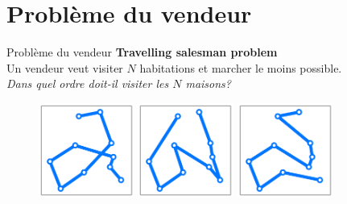 \documentclass{beamer}
\begin{document}
\section{Problème du vendeur}
\begin{frame}{Problème du vendeur}
  \textbf{Travelling salesman problem}\\
  Un vendeur veut visiter $N$ habitations et marcher le moins possible.\\
  \textit{Dans quel ordre doit-il visiter les $N$ maisons?}
  \begin{figure}[b]
    \centering
    \includegraphics[width=0.28\textwidth]{figures/salesman_tabu_n10_1.pdf}
    \quad
    \includegraphics[width=0.28\textwidth]{figures/salesman_tabu_n10_2.pdf}
    \quad
    \includegraphics[width=0.28\textwidth]{figures/salesman_tabu_n10_3.pdf}
  \end{figure}
\end{frame}
\end{document}
